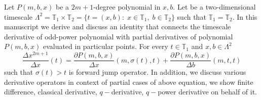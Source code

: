 Let $P(m,b,x)$ be a $2m+1$-degree polynomial in $x,b$.
Let be a two-dimensional timescale
$\Lambda^2 = \mathbb{T}_1 \times \mathbb{T}_2 = \{t=(x, b) \colon \; x\in\mathbb{T}_1, \; b\in\mathbb{T}_2 \}$
such that $\mathbb{T}_1 = \mathbb{T}_2$.
In this manuscript we derive and discuss an identity that connects the timescale derivative of odd-power polynomial
with partial derivatives of polynomial $P(m,b,x)$ evaluated in particular points.
For every $t\in\mathbb{T}_1$ and $x,b\in \Lambda^2$
\[
    \frac{\Delta x^{2m+1}}{\Delta x}(t) =
    \frac{\partial P(m,b,x)}{\Delta x} (m, \sigma(t), t) +
    \frac{\partial P(m,b,x)}{\Delta b} (m, t, t)
\]
such that $\sigma(t) > t$ is forward jump operator.
In addition, we discuss various derivative operators in context of partial cases of above equation,
we show finite difference, classical derivative, $q-$derivative, $q-$power derivative on behalf of it.
